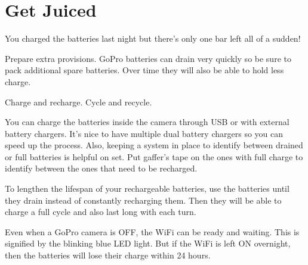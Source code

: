 \chapter{Get Juiced}
\pagecolor{white}
\label{chap:7}
\begin{fullwidth}


\problem

{\large You charged the batteries last night but there’s only one bar left all of a sudden! \par}

Prepare extra provisions. GoPro batteries can drain very quickly so be sure to pack additional spare batteries. Over time they will also be able to hold less charge. 


\solution

{\large Charge and recharge. Cycle and recycle. \par}

You can charge the batteries inside the camera through USB or with external battery chargers. It’s nice to have multiple dual battery chargers so you can speed up the process. Also, keeping a system in place to identify between drained or full batteries is helpful on set. Put gaffer’s tape on the ones with full charge to identify between the ones that need to be recharged. 

To lengthen the lifespan of your rechargeable batteries, use the batteries until they drain instead of constantly recharging them. Then they will be able to charge a full cycle and also last long with each turn. 

\tip Even when a GoPro camera is OFF, the WiFi can be ready and waiting. This is signified by the blinking blue LED light. But if the WiFi is left ON overnight, then the batteries will lose their charge within 24 hours.




\clearpage
\end{fullwidth}
